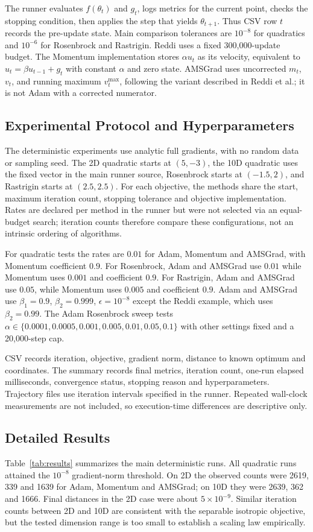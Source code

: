 ﻿\documentclass[conference]{IEEEtran}
\begin{document}
The runner evaluates $f(\theta_t)$ and $g_t$, logs metrics for the current point, checks the stopping condition, then applies the step that yields $\theta_{t+1}$. Thus CSV row $t$ records the pre-update state. Main comparison tolerances are $10^{-8}$ for quadratics and $10^{-6}$ for Rosenbrock and Rastrigin. Reddi uses a fixed 300,000-update budget. The Momentum implementation stores $\alpha u_t$ as its velocity, equivalent to $u_t=\beta u_{t-1}+g_t$ with constant $\alpha$ and zero state. AMSGrad uses uncorrected $m_t$, $v_t$, and running maximum $v_t^{\max}$, following the variant described in Reddi et al.; it is not Adam with a corrected numerator.
\subsection{Experimental Protocol and Hyperparameters}
The deterministic experiments use analytic full gradients, with no random data or sampling seed. The 2D quadratic starts at $(5,-3)$, the 10D quadratic uses the fixed vector in the main runner source, Rosenbrock starts at $(-1.5,2)$, and Rastrigin starts at $(2.5,2.5)$. For each objective, the methods share the start, maximum iteration count, stopping tolerance and objective implementation. Rates are declared per method in the runner but were not selected via an equal-budget search; iteration counts therefore compare these configurations, not an intrinsic ordering of algorithms.

For quadratic tests the rates are $0.01$ for Adam, Momentum and AMSGrad, with Momentum coefficient $0.9$. For Rosenbrock, Adam and AMSGrad use $0.01$ while Momentum uses $0.001$ and coefficient $0.9$. For Rastrigin, Adam and AMSGrad use $0.05$, while Momentum uses $0.005$ and coefficient $0.9$. Adam and AMSGrad use $\beta_1=0.9$, $\beta_2=0.999$, $\epsilon=10^{-8}$ except the Reddi example, which uses $\beta_2=0.99$. The Adam Rosenbrock sweep tests $\alpha\in\{0.0001,0.0005,0.001,0.005,0.01,0.05,0.1\}$ with other settings fixed and a 20,000-step cap.

CSV records iteration, objective, gradient norm, distance to known optimum and coordinates. The summary records final metrics, iteration count, one-run elapsed milliseconds, convergence status, stopping reason and hyperparameters. Trajectory files use iteration intervals specified in the runner. Repeated wall-clock measurements are not included, so execution-time differences are descriptive only.
\subsection{Detailed Results}
Table~\ref{tab:results} summarizes the main deterministic runs. All quadratic runs attained the $10^{-8}$ gradient-norm threshold. On 2D the observed counts were 2619, 339 and 1639 for Adam, Momentum and AMSGrad; on 10D they were 2639, 362 and 1666. Final distances in the 2D case were about $5\times10^{-9}$. Similar iteration counts between 2D and 10D are consistent with the separable isotropic objective, but the tested dimension range is too small to establish a scaling law empirically.
\end{document}
